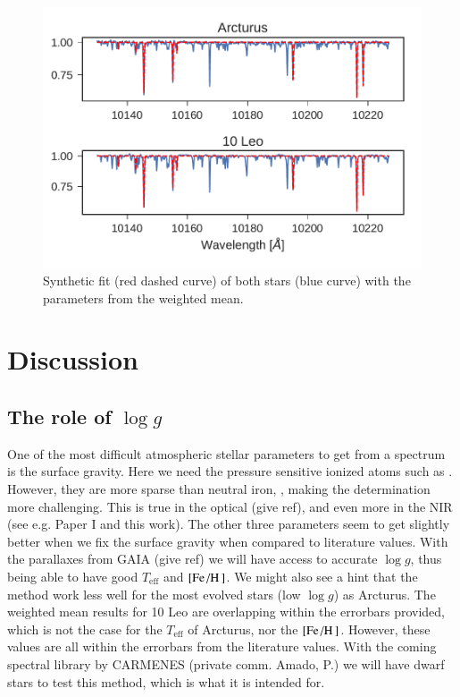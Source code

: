 \documentclass{aa}
\begin{document}
\begin{figure}[tpb]
    \centering
    \includegraphics[width=1.0\linewidth]{figures/syntheticFit.pdf}
    \caption{Synthetic fit (red dashed curve) of both stars (blue curve) with
             the parameters from the weighted mean.}
    \label{fig:synth}
\end{figure}


\section{Discussion}
\label{sec:discussion}

\subsection{The role of $\log g$}

One of the most difficult atmospheric stellar parameters to get from a spectrum
is the surface gravity. Here we need the pressure sensitive ionized atoms such
as . However, they are more sparse than neutral iron, ,
making the determination more challenging. This is true in the optical (give
ref), and even more in the NIR (see e.g. Paper I and this work). The other three
parameters seem to get slightly better when we fix the surface gravity when
compared to literature values. With the parallaxes from GAIA (give ref) we will
have access to accurate $\log g$, thus being able to have good $T_\mathrm{eff}$
and $[\ion{Fe}/\ion{H}]$. We might also see a hint that the method work less
well for the most evolved stars (low $\log g$) as Arcturus. The weighted mean
results for 10 Leo are overlapping within the errorbars provided, which is not
the case for the $T_\mathrm{eff}$ of Arcturus, nor the $[\ion{Fe}/\ion{H}]$.
However, these values are all within the errorbars from the literature values.
With the coming spectral library by CARMENES (private comm. Amado, P.) we will
have dwarf stars to test this method, which is what it is intended for.
\end{document}
